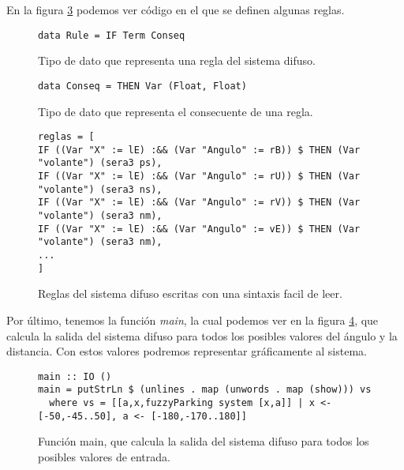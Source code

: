 En la figura \ref{code:codigo11} podemos ver código en el que se 
definen algunas reglas.

\begin{figure}
\begin{lstlisting}
data Rule = IF Term Conseq
\end{lstlisting}
\caption{Tipo de dato que representa una regla del sistema difuso.}
\label{code:codigo9}
\end{figure}

\begin{figure}
\begin{lstlisting}
data Conseq = THEN Var (Float, Float)
\end{lstlisting}
\caption{Tipo de dato que representa el consecuente de una regla.}
\label{code:codigo10}
\end{figure}

\begin{figure}
\begin{lstlisting}
reglas = [
IF ((Var "X" := lE) :&& (Var "Angulo" := rB)) $ THEN (Var "volante") (sera3 ps),
IF ((Var "X" := lE) :&& (Var "Angulo" := rU)) $ THEN (Var "volante") (sera3 ns),
IF ((Var "X" := lE) :&& (Var "Angulo" := rV)) $ THEN (Var "volante") (sera3 nm),
IF ((Var "X" := lE) :&& (Var "Angulo" := vE)) $ THEN (Var "volante") (sera3 nm),
...
]
\end{lstlisting}
\caption{Reglas del sistema difuso escritas con una sintaxis facil de leer.}
\label{code:codigo11}
\end{figure}

Por último, tenemos la función \emph{main}, la cual podemos ver en la
figura \ref{code:codigo12}, que calcula la
salida del sistema difuso para todos los posibles valores del ángulo y
la distancia. Con estos valores podremos representar gráficamente al
sistema.

\begin{figure}
\begin{lstlisting}
main :: IO ()
main = putStrLn $ (unlines . map (unwords . map (show))) vs
  where vs = [[a,x,fuzzyParking system [x,a]] | x <- [-50,-45..50], a <- [-180,-170..180]]
\end{lstlisting}
\caption{Función main, que calcula la salida del sistema difuso para
  todos los posibles valores de entrada.}
\label{code:codigo12}
\end{figure}